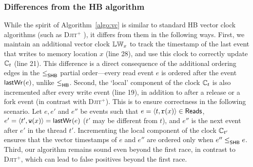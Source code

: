 \subsubsection{Differences from the HB algorithm}
While the spirit of Algorithm~\ref{algo:vc} is similar to standard HB
vector clock algorithms (such as \textsc{Djit}$^+$
\cite{Pozniansky:2003:EOD:966049.781529}), it differs from them in the
following ways.  First, we maintain an additional vector clock $\mathbb{LW}_x$
to track the timestamp of the last event that writes to memory
location $x$ (line 28), and use this clock to correctly update $\mathbb{C}_t$
(line 21).  This difference is a direct consequence of the additional
ordering edges in the $\leq^{}_{\mathsf{SHB}}$ partial order---every read event $e$ is
ordered after the event $\mathsf{lastWr}_{}(e)$, unlike $\leq^{}_{\mathsf{HB}}$.  Second, the
`local' component of the clock $\mathbb{C}_t$ is also incremented after every
write event (line 19), in addition to after a release or a fork event
(in contrast with \textsc{Djit}$^+$).  This is to ensure correctness
in the following scenario.  Let $e, e'$ and $e''$ be events such that
$e = \langle t, \mathtt{r}(x)\rangle\in \mathsf{Reads}_{}$, $e' = \langle t', \mathtt{w}(x)\rangle = \mathsf{lastWr}_{}(e)$
($t'$ may be different from $t$), and $e''$ is the next event after
$e'$ in the thread $t'$.  Incrementing the local component of the
clock $\mathbb{C}_{t'}$ ensures that the vector timestamps of $e$ and $e''$
are ordered only when $e'' \leq^{}_{\mathsf{SHB}} e$.  Third, our algorithm remains
sound even beyond the first race, in contrast to \textsc{Djit}$^+$,
which can lead to false positives beyond the first race.%

